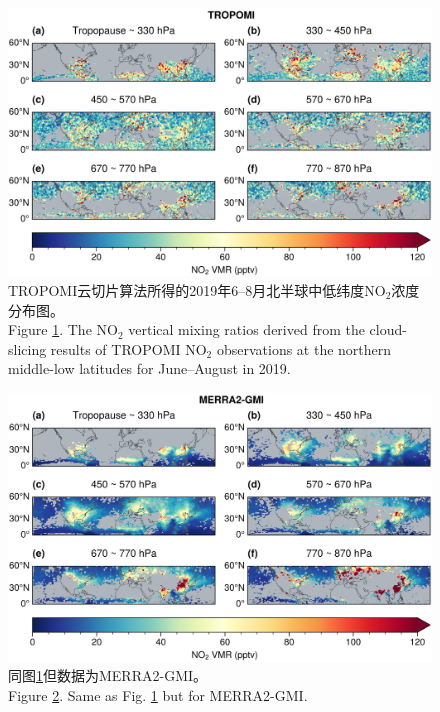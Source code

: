 \begin{figure}[!htbp]
    \centering
    \includegraphics[width=14cm]{./figures/utno2_tropomi.png}
    \caption{
    TROPOMI云切片算法所得的2019年6--8月北半球中低纬度NO$_2$浓度分布图。 \\
    Figure \ref{fig:utno2_tropomi}. The NO$_2$ vertical mixing ratios derived from the cloud-slicing results of TROPOMI NO$_2$ observations at the northern middle-low latitudes for June--August in 2019.
    }
    \label{fig:utno2_tropomi}
\end{figure}

\begin{figure}[!htbp]
    \centering
    \includegraphics[width=14cm]{./figures/utno2_merra2-gmi.png}
    \caption{
    同图\ref{fig:utno2_tropomi}但数据为MERRA2-GMI。 \\
    Figure \ref{fig:utno2_merra2}. Same as Fig. \ref{fig:utno2_tropomi} but for MERRA2-GMI.
    }
    \label{fig:utno2_merra2}
\end{figure}


